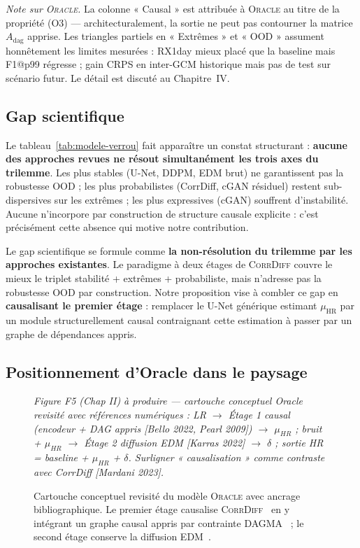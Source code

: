 \documentclass[14pt,a4paper,openany]{extreport}
\theoremstyle{definition}
\newcommand{\Oracle}{\textsc{Oracle}}
\newcommand{\CorrDiff}{\textsc{CorrDiff}}
\newcommand{\HR}{\ensuremath{\text{HR}}}
\newcommand{\muHR}{\ensuremath{\mu_{\HR}}}
\newcommand{\Adag}{\ensuremath{A_{\mathrm{dag}}}}
\newcommand{\figplaceholder}[2][0.9\linewidth]{%
  \begin{tcolorbox}[width=#1,height=5cm,valign=center,colback=gray!8,colframe=gray!45,arc=2pt,boxrule=0.5pt]
    \centering\small\textit{#2}
  \end{tcolorbox}%
}
\begin{document}
\noindent\emph{Note sur \Oracle{}.} La colonne « Causal » est attribuée à \Oracle{} au titre de la propriété (O3) --- architecturalement, la sortie ne peut pas contourner la matrice $\Adag$ apprise. Les triangles partiels en « Extrêmes » et « OOD » assument honnêtement les limites mesurées : RX1day mieux placé que la baseline mais F1@p99 régresse ; gain CRPS en inter-GCM historique mais pas de test sur scénario futur. Le détail est discuté au Chapitre~IV.

\subsection{Gap scientifique}
\label{ssec:soa-gap}

Le tableau~\ref{tab:modele-verrou} fait apparaître un constat structurant : \textbf{aucune des approches revues ne résout simultanément les trois axes du trilemme}. Les plus stables (U-Net, DDPM, EDM brut) ne garantissent pas la robustesse OOD ; les plus probabilistes (CorrDiff, cGAN résiduel) restent sub-dispersives sur les extrêmes ; les plus expressives (cGAN) souffrent d'instabilité. Aucune n'incorpore par construction de structure causale explicite : c'est précisément cette absence qui motive notre contribution.

Le gap scientifique se formule comme \textbf{la non-résolution du trilemme par les approches existantes}. Le paradigme à deux étages de \CorrDiff{} couvre le mieux le triplet stabilité + extrêmes + probabiliste, mais n'adresse pas la robustesse OOD par construction. Notre proposition vise à combler ce gap en \textbf{causalisant le premier étage} : remplacer le U-Net générique estimant $\muHR$ par un module structurellement causal contraignant cette estimation à passer par un graphe de dépendances appris.

\subsection{Positionnement d'Oracle dans le paysage}
\label{ssec:soa-oracle-position}

\begin{figure}[ht]
  \centering
  \figplaceholder{Figure F5 (Chap II) à produire --- cartouche conceptuel Oracle revisité avec références numériques : LR $\to$ Étage 1 causal (encodeur + DAG appris [Bello 2022, Pearl 2009]) $\to$ $\mu_{HR}$ ; bruit + $\mu_{HR}$ $\to$ Étage 2 diffusion EDM [Karras 2022] $\to$ $\delta$ ; sortie HR = baseline + $\mu_{HR}$ + $\delta$. Surligner « causalisation » comme contraste avec CorrDiff [Mardani 2023].}
  \caption{Cartouche conceptuel revisité du modèle \Oracle{} avec ancrage bibliographique. Le premier étage causalise \CorrDiff{}~\cite{mardani_corrdiff_2023} en y intégrant un graphe causal appris par contrainte DAGMA~\cite{bello_dagma_2022} ; le second étage conserve la diffusion EDM~\cite{karras_edm_2022}.}
  \label{fig:oracle-revisite}
\end{figure}
\end{document}
